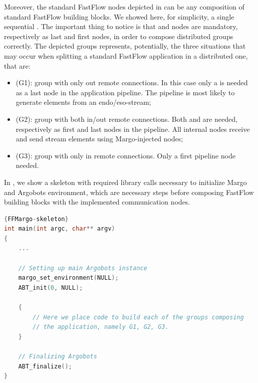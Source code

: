 Moreover, the standard FastFlow nodes depicted in  can be any composition of standard FastFlow building blocks. We showed here, for simplicity, a single sequential . The important thing to notice is that  and  nodes are mandatory, respectively as last and first nodes, in order to compose distributed groups correctly. The depicted groups represents, potentially, the three situations that may occur when splitting a standard FastFlow application in a distributed one, that are:
\begin{itemize}
    \item (G1): group with only out remote connections. In this case only a  is needed as a last node in the application pipeline. The pipeline is most likely to generate elements from an endo/eso-stream;
    \item (G2): group with both in/out remote connections. Both  and  are needed, respectively as first and last nodes in the pipeline. All internal nodes receive and send stream elements using Margo-injected nodes;
    \item (G3): group with only in remote connections. Only a first  pipeline node needed.
\end{itemize}

In , we show a skeleton with required library calls necessary to initialize Margo and Argobots environment, which are necessary steps before composing FastFlow building blocks with the implemented communication nodes.

\begin{lstlisting}[language=C++, style=mystyle, caption={Skeleton of a sample FastFlow application using Margo as communication layer.}, label={FFMargo-skeleton}]{FFMargo-skeleton}
int main(int argc, char** argv)
{
    ...

    // Setting up main Argobots instance
    margo_set_environment(NULL);
    ABT_init(0, NULL);

    {
        // Here we place code to build each of the groups composing
        // the application, namely G1, G2, G3.
    }

    // Finalizing Argobots
    ABT_finalize();
}
\end{lstlisting}

